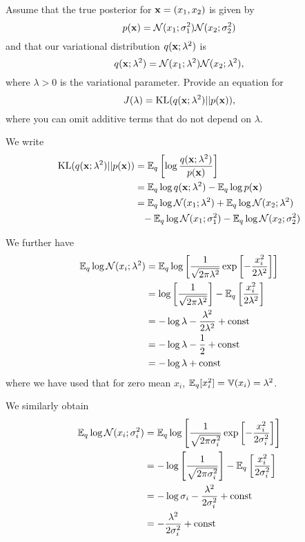 \begin{exenumerate}

\item Assume that the true posterior for $\mathbf{x} = (x_1, x_2)$ is given by
  \begin{equation}
    p(\mathbf{x}) = \mathcal{N}(x_1 ; \sigma_1^2)\mathcal{N}(x_2 ; \sigma_2^2) 
  \end{equation}
  and that our variational distribution $q(\mathbf{x}; \lambda^2)$ is
  \begin{equation}
    q(\mathbf{x}; \lambda^2) = \mathcal{N}(x_1 ; \lambda^2)\mathcal{N}(x_2 ; \lambda^2),
  \end{equation}
  where $\lambda >0$ is the variational parameter. Provide an
  equation for
  \begin{equation}
    J(\lambda) = \text{KL}(q(\mathbf{x}; \lambda^2) || p(\mathbf{x})),
  \end{equation}
  where you can omit additive terms that do not depend on
  $\lambda$. 

  \begin{solution}

    We write
    \begin{align}
      \text{KL}(q(\mathbf{x}; \lambda^2) || p(\mathbf{x})) & = \mathbb{E}_q \left[ \log  \frac{q(\mathbf{x}; \lambda^2)}{p(\mathbf{x})} \right]\\
      & = \mathbb{E}_q \log q(\mathbf{x}; \lambda^2) - \mathbb{E}_q \log p(\mathbf{x})\\
      & = \mathbb{E}_q \log  \mathcal{N}(x_1 ; \lambda^2) + \mathbb{E}_q \log \mathcal{N}(x_2 ; \lambda^2) \nonumber \\
      & \phantom{=} - \mathbb{E}_q \log \mathcal{N}(x_1 ; \sigma_1^2) - \mathbb{E}_q \log \mathcal{N}(x_2 ; \sigma_2^2)
    \end{align}
    
    We further have
    \begin{align}
      \mathbb{E}_q \log  \mathcal{N}(x_i ; \lambda^2) & = \mathbb{E}_q \log \left[ \frac{1}{\sqrt{2\pi \lambda^2}} \exp \left[-\frac{x_i^2}{2 \lambda^2} \right] \right]\\
      & = \log \left[ \frac{1}{\sqrt{2\pi \lambda^2}}\right] -\mathbb{E}_q \left[\frac{x_i^2}{2 \lambda^2}\right]\\
      & = -\log \lambda - \frac{\lambda^2}{2\lambda^2} + \text{const}\\
      & = -\log \lambda - \frac{1}{2} + \text{const}\\
      & = -\log \lambda + \text{const}
    \end{align}
    where we have used that for zero mean $x_i$, $\mathbb{E}_q [x_i^2] = \mathbb{V}(x_i) = \lambda^2$. 

    We similarly obtain
    \begin{align}
    \mathbb{E}_q \log \mathcal{N}(x_i ; \sigma_i^2) & = \mathbb{E}_q \log \left[ \frac{1}{\sqrt{2\pi \sigma_i^2}} \exp \left[-\frac{x_i^2}{2 \sigma_i^2} \right] \right]\\
      & = -\log \left[ \frac{1}{\sqrt{2\pi \sigma_i^2}}\right] -\mathbb{E}_q \left[\frac{x_i^2}{2 \sigma_i^2}\right]\\
    & = -\log \sigma_i - \frac{\lambda^2}{2\sigma_i^2} + \text{const}\\
    & = - \frac{\lambda^2}{2\sigma_i^2} + \text{const}
    \end{align}
    

\end{solution}
\end{exenumerate}
